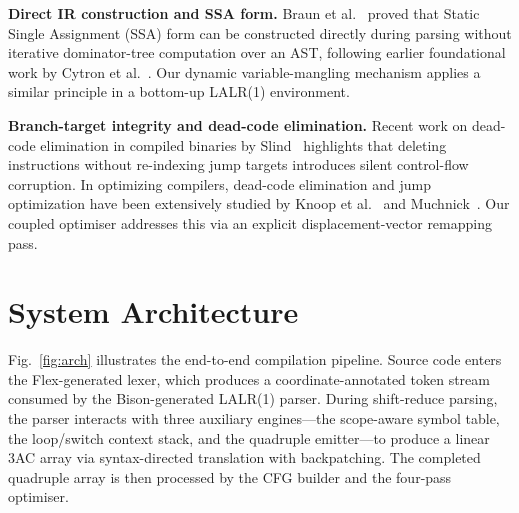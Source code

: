\documentclass[conference]{IEEEtran}
\begin{document}
\textbf{Direct IR construction and SSA form.} Braun et al.~\cite{braun2022} proved that Static Single Assignment (SSA) form can be constructed directly during parsing without iterative dominator-tree computation over an AST, following earlier foundational work by Cytron et al.~\cite{cytron1991}. Our dynamic variable-mangling mechanism applies a similar principle in a bottom-up LALR(1) environment.

\textbf{Branch-target integrity and dead-code elimination.} Recent work on dead-code elimination in compiled binaries by Slind~\cite{xdead} highlights that deleting instructions without re-indexing jump targets introduces silent control-flow corruption. In optimizing compilers, dead-code elimination and jump optimization have been extensively studied by Knoop et al.~\cite{knoop1994} and Muchnick~\cite{muchnick}. Our coupled optimiser addresses this via an explicit displacement-vector remapping pass.

\section{System Architecture}
\label{sec:arch}

Fig.~\ref{fig:arch} illustrates the end-to-end compilation pipeline. Source code enters the Flex-generated lexer, which produces a coordinate-annotated token stream consumed by the Bison-generated LALR(1) parser. During shift-reduce parsing, the parser interacts with three auxiliary engines---the scope-aware symbol table, the loop/switch context stack, and the quadruple emitter---to produce a linear 3AC array via syntax-directed translation with backpatching. The completed quadruple array is then processed by the CFG builder and the four-pass optimiser.
\end{document}
